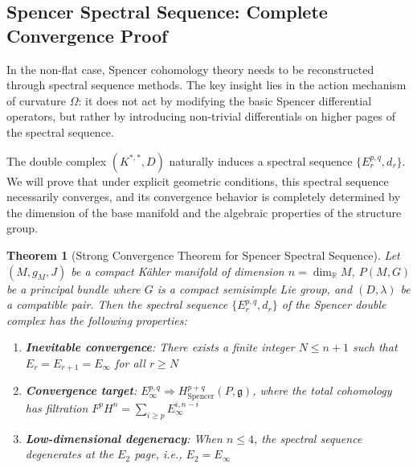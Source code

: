 \documentclass[a4paper,12pt]{extarticle}
\newtheorem{theorem}{Theorem}
\theoremstyle{definition}
\begin{document}

\subsection{Spencer Spectral Sequence: Complete Convergence Proof}

In the non-flat case, Spencer cohomology theory needs to be reconstructed through spectral sequence methods. The key insight lies in the action mechanism of curvature $\Omega$: it does not act by modifying the basic Spencer differential operators, but rather by introducing non-trivial differentials on higher pages of the spectral sequence.

The double complex $(K^{*,*}, D)$ naturally induces a spectral sequence $\{E_r^{p,q}, d_r\}$. We will prove that under explicit geometric conditions, this spectral sequence necessarily converges, and its convergence behavior is completely determined by the dimension of the base manifold and the algebraic properties of the structure group.

\begin{theorem}[Strong Convergence Theorem for Spencer Spectral Sequence]
Let $(M, g_M, J)$ be a compact Kähler manifold of dimension $n = \dim_{\mathbb{R}} M$, $P(M, G)$ be a principal bundle where $G$ is a compact semisimple Lie group, and $(D, \lambda)$ be a compatible pair. Then the spectral sequence $\{E_r^{p,q}, d_r\}$ of the Spencer double complex has the following properties:
\begin{enumerate}
\item \textbf{Inevitable convergence}: There exists a finite integer $N \leq n+1$ such that $E_r = E_{r+1} = E_\infty$ for all $r \geq N$
\item \textbf{Convergence target}: $E_\infty^{p,q} \Rightarrow H^{p+q}_{\text{Spencer}}(P, \mathfrak{g})$, where the total cohomology has filtration $F^p H^n = \sum_{i \geq p} E_\infty^{i,n-i}$
\item \textbf{Low-dimensional degeneracy}: When $n \leq 4$, the spectral sequence degenerates at the $E_2$ page, i.e., $E_2 = E_\infty$
\end{enumerate}
\end{theorem}
\end{document}

